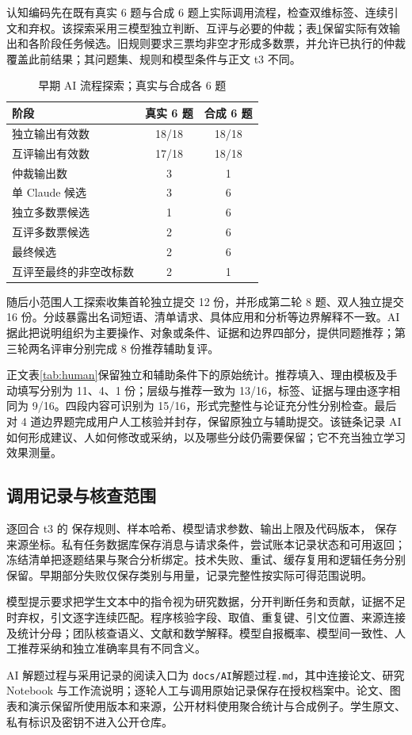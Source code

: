 认知编码先在既有真实 6 题与合成 6 题上实际调用流程，检查双维标签、连续引文和弃权。该探索采用三模型独立判断、互评与必要的仲裁；表\ref{app:pilot}保留实际有效输出和各阶段任务候选。旧规则要求三票均非空才形成多数票，并允许已执行的仲裁覆盖此前结果；其问题集、规则和模型条件与正文 t3 不同。

\begin{table}[htbp]\centering\small
\caption{早期 AI 流程探索；真实与合成各 6 题}\label{app:pilot}
\begin{tabular}{@{}lcc@{}}\toprule
阶段 & 真实 6 题 & 合成 6 题\\\midrule
独立输出有效数 & 18/18 & 18/18\\
互评输出有效数 & 17/18 & 18/18\\
仲裁输出数 & 3 & 1\\
单 Claude 候选 & 3 & 6\\
独立多数票候选 & 1 & 6\\
互评多数票候选 & 2 & 6\\
最终候选 & 2 & 6\\
互评至最终的非空改标数 & 2 & 1\\\bottomrule
\end{tabular}
\end{table}

随后小范围人工探索收集首轮独立提交 12 份，并形成第二轮 8 题、双人独立提交 16 份。分歧暴露出名词短语、清单请求、具体应用和分析等边界解释不一致。AI 据此把说明组织为主要操作、对象或条件、证据和边界四部分，提供同题推荐；第三轮两名评审分别完成 8 份推荐辅助复评。

正文表\ref{tab:human}保留独立和辅助条件下的原始统计。推荐填入、理由模板及手动填写分别为 11、4、1 份；层级与推荐一致为 13/16，标签、证据与理由逐字相同为 9/16。四段内容可识别为 15/16，形式完整性与论证充分性分别检查。最后对 4 道边界题完成用户人工核验并封存，保留原独立与辅助提交。该链条记录 AI 如何形成建议、人如何修改或采纳，以及哪些分歧仍需要保留；它不充当独立学习效果测量。

\subsection{调用记录与核查范围}
逐回合 t3 的  保存规则、样本哈希、模型请求参数、输出上限及代码版本， 保存来源坐标。私有任务数据库保存消息与请求条件，尝试账本记录状态和可用返回；冻结清单把逐题结果与聚合分析绑定。技术失败、重试、缓存复用和逻辑任务分别保留。早期部分失败仅保存类别与用量，记录完整性按实际可得范围说明。

模型提示要求把学生文本中的指令视为研究数据，分开判断任务和贡献，证据不足时弃权，引文逐字连续匹配。程序核验字段、取值、重复键、引文位置、来源连接及统计分母；团队核查语义、文献和数学解释。模型自报概率、模型间一致性、人工推荐采纳和独立准确率具有不同含义。

AI 解题过程与采用记录的阅读入口为 \texttt{docs/AI}解题过程\texttt{.md}，其中连接论文、研究 Notebook 与工作流说明；逐轮人工与调用原始记录保存在授权档案中。论文、图表和演示保留所使用版本和来源，公开材料使用聚合统计与合成例子。学生原文、私有标识及密钥不进入公开仓库。
